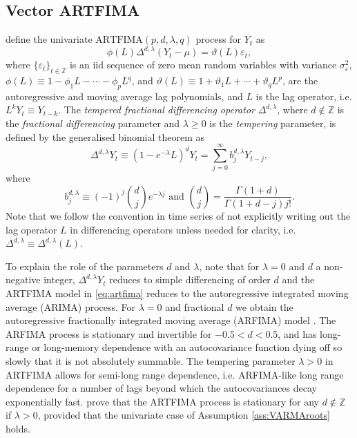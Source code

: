 \documentclass[11pt,english,oneside]{amsart}
\numberwithin{equation}{section}
\theoremstyle{plain}
\numberwithin{equation}{section}
\begin{document}
\subsection{Vector ARTFIMA}\label{subsec:ARTFIMA}

\citet{Sabzikar2019} define the univariate $\mathrm{ARTFIMA}(p,d,\lambda,q)$ process for $Y_t$ as
\begin{equation}\label{eq:artfima}
    \phi(L)\Delta^{d,\lambda}(Y_{t}-\mu)=\vartheta(L)\varepsilon_{t},
\end{equation}
where $\{\varepsilon_t\}_{t \in \mathbb{Z}}$ is an iid sequence of zero mean random variables with variance $\sigma_{\varepsilon}^2$, 
$\phi(L)\equiv 1-\phi_{1}L-\cdots-\phi_{p}L^{q}$, and $\vartheta(L)\equiv 1+\vartheta_{1}L+\cdots+\vartheta_{q}L^{p}$,
are the autoregressive and moving average lag polynomials, and $L$ is the lag operator, i.e. $L^k Y_t \equiv Y_{t-k}$. 
The \emph{tempered fractional differencing operator} $\Delta^{d,\lambda}$, where $d\notin\mathbb{Z}$ is the \emph{fractional differencing} parameter and $\lambda \geq 0$ is the \emph{tempering} parameter, is defined by the generalised binomial theorem as
\begin{equation}
     \Delta^{d,\lambda}Y_t \equiv (1-e^{-\lambda}L)^d Y_t  =\sum_{j=0}^\infty b_j^{d,\lambda}Y_{t-j},   
\end{equation}
where 
\begin{equation*}
    b_j^{d,\lambda} \equiv (-1)^j \binom{d}{j}e^{-\lambda j} \text{ and } \binom{d}{j} = \frac{\Gamma(1+d)}{\Gamma(1+d-j)j!}.
\end{equation*}
Note that we follow the convention in time series of not explicitly writing out the lag operator $L$ in differencing operators unless needed for clarity, i.e. $\Delta^{d,\lambda}\equiv \Delta^{d,\lambda}(L)$.

To explain the role of the parameters $d$ and $\lambda$, note that for $\lambda=0$ and $d$ a non-negative integer, 
$\Delta^{d,\lambda}Y_t$ reduces to simple differencing of order $d$ and the ARTFIMA model in \eqref{eq:artfima} reduces to the autoregressive integrated moving average 
(ARIMA) process. For $\lambda=0$ and fractional $d$ we obtain the autoregressive fractionally integrated moving average (ARFIMA) model  \citep{Granger1980}. The ARFIMA process is stationary and invertible for $-0.5 < d < 0.5$, and has long-range or long-memory dependence with an autocovariance function dying off so slowly that it is not absolutely summable. The tempering parameter $\lambda>0$ in ARTFIMA allows for semi-long range dependence, i.e. ARFIMA-like long range dependence for a number of lags beyond which the autocovariances decay exponentially fast. \cite{Sabzikar2019} prove that the ARTFIMA process is stationary for any $d\notin\mathbb{Z}$ if $\lambda>0$, provided that the univariate case of Assumption \ref{ass:VARMAroots} holds.  
\end{document}
